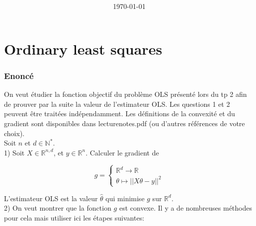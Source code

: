 \documentclass[
10pt, %
a4paper, %
oneside, %
headinclude,footinclude, %
BCOR5mm, %
]{scrartcl}
\title{\normalfont{FTML Exercices 2}\\
}
\author{\spacedlowsmallcaps{}
}
\date{\today}
\begin{document}
\renewcommand{\sectionmark}[1]{\markright{\spacedlowsmallcaps{#1}}}
\lehead{\mbox{\llap{\small\thepage\kern1em\color{halfgray} \vline}\color{halfgray}\hspace{0.5em}\rightmark\hfil}} 
\pagestyle{scrheadings}
\maketitle 
\setcounter{tocdepth}{3} 

\tableofcontents

\section{\large\color{Blue}Ordinary least squares}

\subsubsection{Enoncé}
\label{par:enoncé}

On veut étudier la fonction objectif du problème OLS présenté lors du tp 2 afin de prouver par la suite la valeur de l'estimateur OLS. Les questions 1 et 2 peuvent être traitées indépendamment. Les définitions de la convexité et du gradient sont disponibles dans lecture\textunderscore notes.pdf (ou d'autres références de votre choix).
\\

Soit $n$ et $d\in \mathbb{N}^*$.
\\

1) Soit $X\in \mathbb{R}^{n, d}$, et $y\in \mathbb{R}^n$. Calculer le gradient de 

$$
g = \left\{
    \begin{array}{ll}
        \mathbb{R}^d \rightarrow \mathbb{R}  \\
	\theta\mapsto ||X\theta-y||^2
    \end{array}
\right.
$$

L'estimateur OLS est la valeur $\hat{\theta}$ qui minimise $g$ sur $\mathbb{R}^d$.
\\

2) On veut montrer que la fonction $g$ est convexe. Il
y a de nombreuses méthodes pour cela mais utiliser ici les étapes suivantes:
\end{document}
